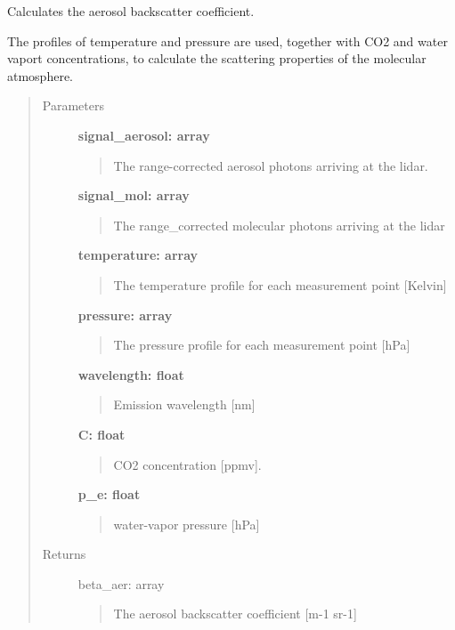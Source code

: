 \documentclass[letterpaper,10pt,english]{sphinxmanual}
\begin{document}
\begin{fulllineitems}
\label{hsrl_retrieval:hsrl_retrieval.aerosol_backscatter}
Calculates the aerosol backscatter coefficient.

The profiles of temperature and pressure are used, together with CO2 and 
water vaport concentrations, to calculate the scattering properties of 
the molecular atmosphere.
\begin{quote}\begin{description}
\item[{Parameters}] \leavevmode
\textbf{signal\_aerosol: array}
\begin{quote}

The range-corrected aerosol photons arriving at the lidar.
\end{quote}

\textbf{signal\_mol: array}
\begin{quote}

The range\_corrected molecular photons arriving at the lidar
\end{quote}

\textbf{temperature: array}
\begin{quote}

The temperature profile for each measurement point {[}Kelvin{]}
\end{quote}

\textbf{pressure: array}
\begin{quote}

The pressure profile for each measurement point {[}hPa{]}
\end{quote}

\textbf{wavelength: float}
\begin{quote}

Emission wavelength {[}nm{]}
\end{quote}

\textbf{C: float}
\begin{quote}

CO2 concentration {[}ppmv{]}.
\end{quote}

\textbf{p\_e: float}
\begin{quote}

water-vapor pressure {[}hPa{]}
\end{quote}

\item[{Returns}] \leavevmode
beta\_aer: array
\begin{quote}

The aerosol backscatter coefficient {[}m-1 sr-1{]}
\end{quote}

\end{description}\end{quote}

\end{fulllineitems}
\end{document}
